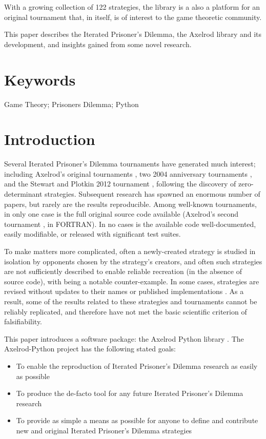 \documentclass{jors}
\begin{document}
With a growing collection of 122 strategies, the library is a also a
platform for an original tournament that, in itself, is of interest to the
game theoretic community.

This paper describes the Iterated Prisoner's Dilemma, the Axelrod library
and its development, and insights gained from some novel research.

\section*{Keywords}

Game Theory; Prisoners Dilemma; Python

\section*{Introduction}

Several Iterated Prisoner's Dilemma tournaments have generated much interest;
including Axelrod's original tournaments \cite{Axelrod1980a,Axelrod1980b},
two 2004 anniversary tournaments \cite{kendall2007iterated}, and
the Stewart and Plotkin 2012 tournament \cite{Stewart2012}, following the
discovery of zero-determinant strategies.  Subsequent research has spawned an
enormous number of papers, but rarely are the results reproducible. Among
well-known tournaments, in only one case is the full original source code
available (Axelrod's second tournament \cite{Axelrod1980b}, in FORTRAN). In no
cases is the available code well-documented, easily modifiable, or released with
significant test suites.

To make matters more complicated, often a newly-created strategy is studied in
isolation by opponents chosen by the strategy's creators, and often such
strategies are not sufficiently described to enable reliable recreation
(in the absence of source code), with \cite{slany2007some} being a notable
counter-example. In some cases, strategies are revised without updates to their
names or published implementations \cite{li2007design, li2011engineering}.
As a result, some of the results related to these strategies and tournaments
cannot be reliably replicated, and therefore have not met the basic scientific
criterion of falsifiability.

This paper introduces a software package: the Axelrod Python library
\cite{Axelrod-Pythonprojectteam2015}. The Axelrod-Python project has the
following stated goals:

\begin{itemize}[noitemsep,topsep=0pt]
    \item To enable the reproduction of Iterated Prisoner's Dilemma
    research as easily as possible
    \item To produce the de-facto tool for any future Iterated Prisoner's
    Dilemma research
    \item To provide as simple a means as possible for anyone to define and
    contribute new and original Iterated Prisoner's Dilemma strategies
\end{itemize}
\end{document}
